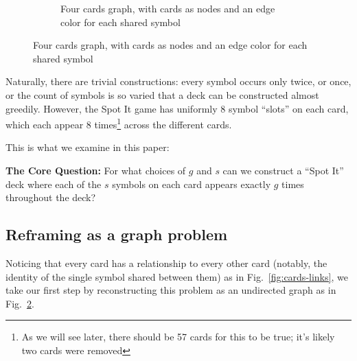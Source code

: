 \documentclass[11pt, oneside]{article} 	%
\begin{document}
\begin{figure}[!htb]
\begin{subfigure}{.2\textwidth}
\caption{Four cards graph, with cards as nodes and an edge color for each shared symbol}
\label{fig:cards-graph}
\end{subfigure}

\end{figure}

Naturally, there are trivial constructions: every symbol occurs only twice, or once, or the count of symbols is so varied that a deck can be constructed almost greedily. However, the Spot It game has uniformly 8 symbol ``slots'' on each card, which each appear 8 times\footnote{As we will see later, there should be 57 cards for this to be true; it's likely two cards were removed} across the different cards. 

This is what we examine in this paper:

\begin{framed}
\textbf{The Core Question:} For what choices of $g$ and $s$ can we construct a ``Spot It'' deck where each of the $s$ symbols on each card appears exactly $g$ times throughout the deck?
\end{framed}

\subsection{Reframing as a graph problem}
Noticing that every card has a relationship to every other card (notably, the identity of the single symbol shared between them) as in Fig.~\ref{fig:cards-links}, we take our first step by reconstructing this problem as an undirected graph as in Fig.~\ref{fig:cards-graph}. 
\end{document}
